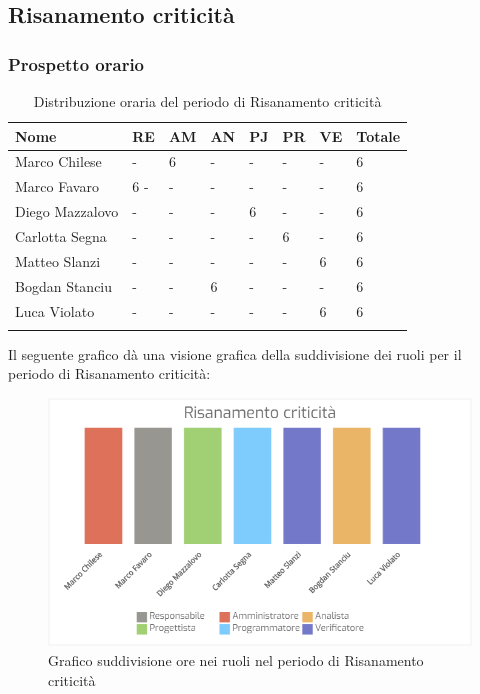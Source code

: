 \subsection{Risanamento criticità}
\subsubsection{Prospetto orario}

\begin{longtable}{|C{.30\textwidth}|C{.06\textwidth}|C{.06\textwidth}|C{.06\textwidth} | C{.06\textwidth}| C{.06\textwidth} | C{.06\textwidth} | C{.10\textwidth} |}
\hline
\textbf{Nome} & \textbf{RE} & \textbf{AM} & \textbf{AN} & \textbf{PJ} & \textbf{PR} & \textbf{VE} & \textbf{Totale}\\
\hline 
Marco Chilese & - & 6 & - & - & - & - & 6 \\
\hline
Marco Favaro & 6 - & - & - & - & - & - & 6 \\
\hline
Diego Mazzalovo & - & - & - & 6 & - & - & 6 \\
\hline
Carlotta Segna & - & - & - & - & 6 & - & 6 \\
\hline
Matteo Slanzi & - & - & - & - & - & 6 & 6 \\
\hline
Bogdan Stanciu & - & - & 6 & - & - & - & 6 \\
\hline
Luca Violato & - & - & - & - & - & 6 & 6 \\   
\hline


\caption{Distribuzione oraria del periodo di Risanamento criticità}
\label{Distribuzione oraria del periodo di Risanamento criticità}
\end{longtable}

Il seguente grafico dà una visione grafica della suddivisione dei ruoli per il periodo di Risanamento criticità:\begin{figure}[H]
	\centering
  		\includegraphics[width=1\linewidth]{./images/risanamento_criticita2.png}
  		\caption{Grafico suddivisione ore nei ruoli nel periodo di Risanamento criticità}
  		\label{fig:grafico suddivione ruoli nel periodo di Risanamento criticità}
\end{figure}



